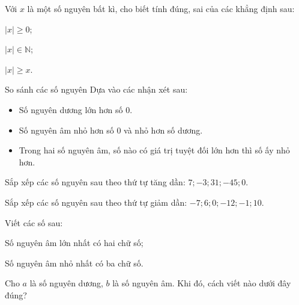 \begin{vd}%
Với $x$ là một số nguyên bất kì, cho biết tính đúng, sai của các khẳng định sau:
\begin{enumEX}{1}
\item $|x|\ge 0$;
\item $|x|\in\mathbb{N}$;
\item $|x|\ge x$.
\end{enumEX}
\end{vd}

\begin{dang}{So sánh các số nguyên}
Dựa vào các nhận xét sau:
\begin{itemize}
\item Số nguyên dương lớn hơn số $0$.
\item Số nguyên âm nhỏ hơn số $0$ và nhỏ hơn số dương.
\item Trong hai số nguyên âm, số nào có giá trị tuyệt đối lớn hơn thì số ấy nhỏ hơn.
\end{itemize}
\end{dang}

\begin{vd}%
Sắp xếp các số nguyên sau theo thứ tự tăng dần:
$7;-3;31;-45;0.$
\end{vd}

\begin{vd}%
Sắp xếp các số nguyên sau theo thứ tự giảm dần:
$-7;6;0;-12;-1;10.$
\end{vd}

\begin{vd}%
Viết các số sau:
\begin{enumEX}{1}
\item Số nguyên âm lớn nhất có hai chữ số;
\item Số nguyên âm nhỏ nhất có ba chữ số.
\end{enumEX}
\end{vd}

\begin{vd}%
Cho $a$ là số nguyên dương, $b$ là số nguyên âm. Khi đó, cách viết nào dưới đây đúng?
\end{vd}

